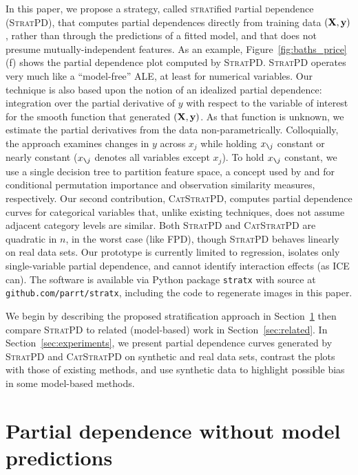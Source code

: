 \documentclass[]{article} %
\newcommand{\secref}[1]{Section~\ref{#1}}
\newcommand{\figref}[1]{Figure~\ref{#1}}
\newcommand{\spd}{\fontfamily{cmr}\textsc{\small StratPD}}
\newcommand{\cspd}{\fontfamily{cmr}\textsc{\small CatStratPD}}
\newcommand{\xnj}{$x_{\texttt{\char`\\} j}$}
\begin{document}
In this paper, we propose a strategy, called {\textsc{strat}ified \textsc{p}artial \textsc{d}ependence} (\spd{}), that computes partial dependences directly from training data $({\bf X}, {\bf y})$, rather than through the predictions of a fitted model, and that does not presume mutually-independent features. As an example, \figref{fig:baths_price}(f) shows the partial dependence plot computed by \spd.  \spd{} operates very much like a ``model-free'' ALE, at least for numerical variables.  Our technique is also based upon the notion of an idealized partial dependence:  integration over the partial derivative of $y$ with respect to the variable of interest for the smooth function that generated $({\bf X}, {\bf y})$. As that function is unknown, we estimate the partial derivatives from the data non-parametrically.  Colloquially, the approach examines changes in $y$ across $x_j$ while holding \xnj{} constant or nearly constant (\xnj{} denotes all variables except $x_j$).  To hold \xnj{} constant, we use a single decision tree to partition feature space, a concept used by \citet{rfimp} and \citet{RFunsup} for conditional permutation importance and observation similarity measures, respectively.  Our second contribution, \cspd{}, computes partial dependence curves for categorical variables that, unlike existing techniques, does not assume adjacent category levels are similar. Both \spd{} and \cspd{} are quadratic in $n$, in the worst case (like FPD), though \spd{} behaves linearly on real data sets.  Our prototype is currently limited to regression, isolates only single-variable partial dependence, and cannot identify interaction effects (as ICE can).  The software is available via Python package {\tt stratx} with source at {\tt github.com/parrt/stratx}, including the code to regenerate images in this paper.

We begin by describing the proposed stratification approach in \secref{sec:stratpd} then compare \spd{} to related (model-based) work in \secref{sec:related}. In \secref{sec:experiments}, we present partial dependence curves generated by \spd{} and \cspd{} on synthetic and real data sets, contrast the plots with those of existing methods, and use synthetic data to highlight possible bias in some model-based methods.

\section{Partial dependence without model predictions}\label{sec:stratpd}
\end{document}
